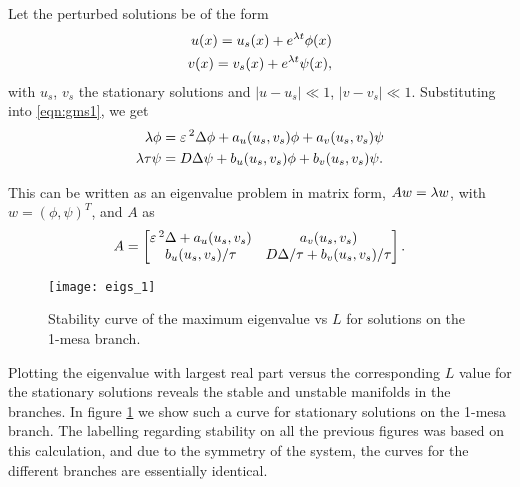 Let the perturbed solutions be of the form
% 
\begin{equation}
\label{eqn:gms_eigs}
\begin{split}
\begin{aligned}
u(x) = u_s(x) + e^{\lambda t}\phi(x)\\
v(x) = v_s(x) + e^{\lambda t}\psi(x),
\end{aligned}
\end{split}
\end{equation}
% 
with $u_s$, $v_s$ the stationary solutions and $|u-u_s|\ll 1$, $|v-v_s|\ll 1$. Substituting into \eqref{eqn:gms1}, we get
% 
\begin{equation}
\label{eqn:gms_2}
\begin{split}
\begin{aligned}
	\lambda \phi &= \varepsilon\,^2\Delta \phi + a_u(u_s,v_s)\phi + a_v(u_s,v_s)\psi \\
	\lambda\tau \psi &= D\Delta \psi + b_u(u_s,v_s)\phi + b_v(u_s,v_s)\psi.
\end{aligned}
\end{split}
\end{equation}

This can be written as an eigenvalue problem in matrix form, $Aw = \lambda w$, with $w = (\phi,\psi)^T$, and $A$ as
% 
\begin{equation}
\label{eqn:Amatrix}
  A =
	\begin{bmatrix}
		\varepsilon\,^2\Delta + a_u(u_s,v_s)& a_v(u_s,v_s) \\
		b_u(u_s,v_s)/\tau& D\Delta/\tau + b_v(u_s,v_s)/\tau
  \end{bmatrix}.
\end{equation}

% 
\begin{figure}[htb]
\begin{center}
\texttt{[image: eigs\_1]}
\caption{Stability curve of the maximum eigenvalue vs $L$ for solutions on the 1-mesa branch.}
\label{fig:eigs1}
\end{center}
\end{figure}
% 

Plotting the eigenvalue with largest real part versus the corresponding $L$ value for the stationary solutions reveals the stable and unstable manifolds in the branches. In figure \ref{fig:eigs1} we show such a curve for stationary solutions on the 1-mesa branch. The labelling regarding stability on all the previous figures was based on this calculation, and due to the symmetry of the system, the curves for the different branches are essentially identical.

